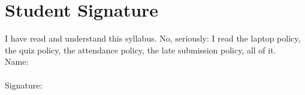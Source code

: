 \documentclass[12pt]{article}
\begin{document}
\section{Student Signature}

I have read and understand this syllabus. No, seriously: I read the laptop policy, the quiz policy, the attendance policy, the late submission policy, all of it. \\


Name: \\
\vspace{2cm}\\
Signature:
\end{document}
